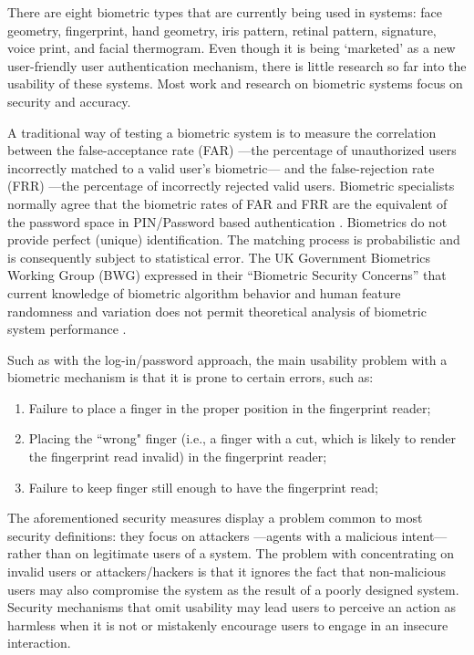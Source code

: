\documentclass{article}
\begin{document}
There are eight biometric types that are currently being used in systems: face geometry, fingerprint, hand geometry, iris pattern, retinal pattern, signature, voice print, and facial thermogram. Even though it is being `marketed' as a new user-friendly user authentication mechanism, there is little research so far into the usability of these systems. Most work and research on biometric systems focus on security and accuracy. 

A traditional way of testing a biometric system is to measure the correlation between the false-acceptance rate (FAR) ---the percentage of unauthorized users incorrectly matched to a valid user's biometric--- and the false-rejection rate (FRR) ---the percentage of incorrectly rejected valid users. Biometric specialists normally agree that the biometric rates of FAR and FRR are the equivalent of the password space in PIN/Password based authentication \cite{biometrics2003biometrics}. Biometrics do not provide perfect (unique) identification. The matching process is probabilistic and is consequently subject to statistical error.    The UK Government Biometrics Working Group (BWG) expressed in their “Biometric Security Concerns” that current knowledge of biometric algorithm behavior and human feature randomness and variation does not permit theoretical analysis of biometric system performance \cite{biometrics2003biometrics}.

Such as with the log-in/password approach, the main usability problem with a biometric mechanism is that it is prone to certain errors, such as:
\begin{enumerate}
\item Failure to place a finger in the proper position in the fingerprint reader;
\item Placing the ``wrong" finger (i.e., a finger with a cut, which is likely to render the fingerprint read invalid) in the fingerprint reader;
\item Failure to keep finger still enough to have the fingerprint read;
\end{enumerate}

The aforementioned security measures display a problem common to most security definitions: they focus on attackers ---agents with a malicious intent--- rather than on legitimate users of a system. The problem with concentrating on invalid users or attackers/hackers is that it ignores the fact that non-malicious users may also compromise the system as the result of a poorly designed system.  Security mechanisms that omit usability may lead users to perceive an action as harmless when it is not or mistakenly encourage users to engage in an insecure interaction. 
\end{document}
